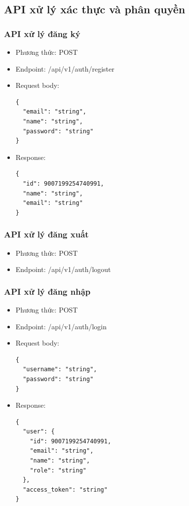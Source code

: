 \documentclass[../BTL.tex]{subfiles}
\begin{document}
\subsection{ API xử lý xác thực và phân quyền}
\subsubsection{ API xử lý đăng ký}
\begin{itemize}
    \item Phương thức: POST
    \item Endpoint: /api/v1/auth/register
    \item Request body: 
        \begin{verbatim}
{
  "email": "string",
  "name": "string",
  "password": "string"
}
        \end{verbatim}
    \item Response:
        \begin{verbatim}          
{
  "id": 9007199254740991,
  "name": "string",
  "email": "string"
}
        \end{verbatim}
\end{itemize}
\subsubsection{ API xử lý đăng xuất}
\begin{itemize}
    \item Phương thức: POST
    \item Endpoint: /api/v1/auth/logout
\end{itemize}
\subsubsection{ API xử lý đăng nhập}
\begin{itemize}
    \item Phương thức: POST
    \item Endpoint: /api/v1/auth/login
    \item Request body: 
        \begin{verbatim}
{
  "username": "string",
  "password": "string"
}
        \end{verbatim}
    \item Response:
        \begin{verbatim}          
{
  "user": {
    "id": 9007199254740991,
    "email": "string",
    "name": "string",
    "role": "string"
  },
  "access_token": "string"
}
        \end{verbatim}
\end{itemize}
\end{document}
